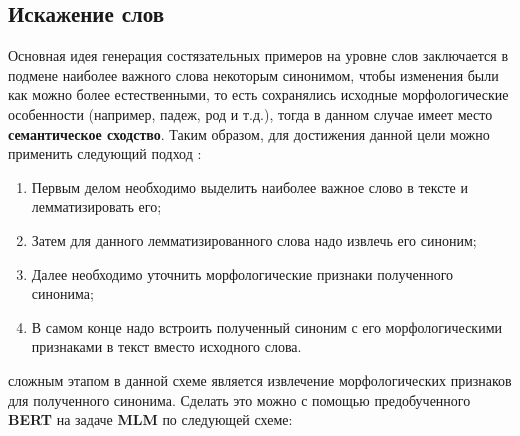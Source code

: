 \subsection{Искажение слов}
\label{sec:AdvWord}

\noindent\hspace{0.6cm}Основная идея генерация состязательных примеров на уровне слов заключается в подмене наиболее важного слова некоторым синонимом, чтобы изменения были как можно более естественными, то есть сохранялись исходные морфологические особенности (например, падеж, род и т.д.), тогда в данном случае имеет место \textbf{семантическое сходство}. Таким образом, для достижения данной цели можно применить следующий подход \cite{adversarialgenerating3}:

\begin{enumerate}
    \item Первым делом необходимо выделить наиболее важное слово в тексте и лемматизировать его;
    \item Затем для данного лемматизированного слова надо извлечь его синоним;
    \item Далее необходимо уточнить морфологические признаки полученного синонима;
    \item В самом конце надо встроить полученный синоним с его морфологическими признаками в текст вместо исходного слова.
\end{enumerate}

 сложным этапом в данной схеме является извлечение морфологических признаков для полученного синонима. Сделать это можно с помощью предобученного \textbf{BERT} на задаче \textbf{MLM} по следующей схеме\cite{adversarialgenerating3}:

